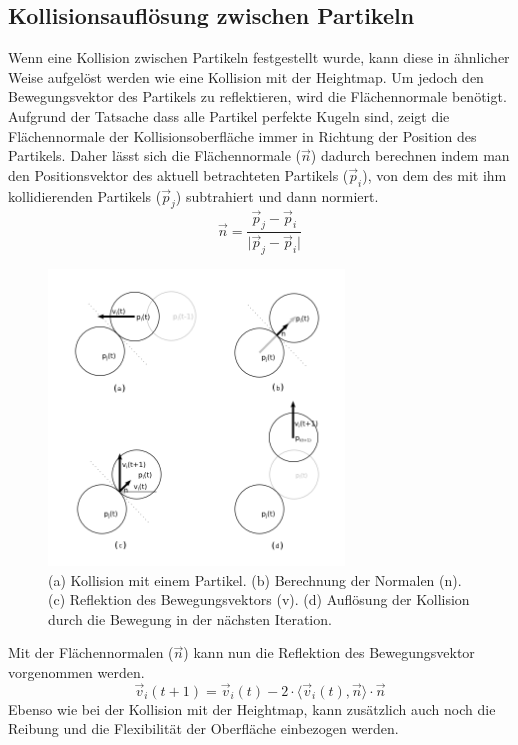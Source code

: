 \begin{Spacing}{\mylinespace}
    \subsection{Kollisionsauflösung zwischen Partikeln}
    	Wenn eine Kollision zwischen Partikeln festgestellt wurde, kann diese in
    	ähnlicher Weise aufgelöst werden wie eine Kollision mit der Heightmap.
    	Um jedoch den Bewegungsvektor des Partikels zu reflektieren, wird die
    	Flächennormale benötigt. Aufgrund der Tatsache dass alle Partikel
    	perfekte Kugeln sind, zeigt die	Flächennormale der Kollisionsoberfläche
    	immer in Richtung der Position des Partikels. Daher lässt sich die
    	Flächennormale ($\vec{n}$) dadurch berechnen indem man den Positionsvektor des
    	aktuell betrachteten Partikels ($\vec{p}_{i}$), von dem des mit ihm kollidierenden
    	Partikels ($\vec{p}_{j}$) subtrahiert und dann normiert.
    	\[ \vec{n} = \frac{ \vec{p}_{j} - \vec{p}_{i} }{ \vert \vec{p}_{j} - \vec{p}_{i} \vert } \]
    	\begin{figure}[h!]
			\centering
			\vspace*{30px}
			\includegraphics[width=0.7\textwidth]{graphics/Phys_kp1234.png}
			\caption{ (a) Kollision mit einem Partikel. (b) Berechnung der Normalen (n). (c) Reflektion des Bewegungsvektors (v). (d) Auflösung der Kollision durch die Bewegung in der nächsten Iteration. }
			\label{fig:partkoll2}
		\end{figure}
		Mit der Flächennormalen ($\vec{n}$) kann nun die Reflektion des
		Bewegungsvektor vorgenommen werden.
		\[ \vec{v}_{i}(t+1) = \vec{v}_{i}(t) -2 \cdot \langle \vec{v}_{i}(t) , \vec{n} \rangle \cdot \vec{n} \]
		Ebenso wie bei der Kollision mit der Heightmap, kann zusätzlich auch
		noch die Reibung und die Flexibilität der Oberfläche einbezogen werden.
	

\end{Spacing}
